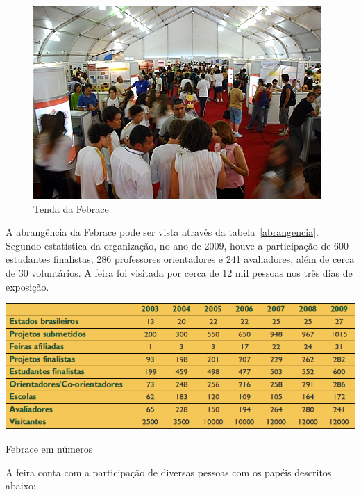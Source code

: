    \begin{figure}
        \begin{center}
    \includegraphics[width=1.0\linewidth]{arquivos/febrace.jpg}
        \end{center}
        \caption{Tenda da Febrace}
        \label{febrace}
    \end{figure}

A abrangência da Febrace pode ser vista através da tabela~\ref{abrangencia}. Segundo estatística da organização, no ano de 2009, houve a participação de 600 estudantes finalistas, 286 professores orientadores e 241 avaliadores, além de cerca de 30 voluntários. A feira foi visitada por cerca de 12 mil pessoas nos três dias de exposição. 

\begin{table}[h]
    \begin{center}
        \includegraphics[width=0.8\linewidth]{arquivos/abrangencia.png}
    \end{center}
    \caption{Febrace em números}
    \label{abrangencia}
\end{table}

A feira conta com a participação de diversas pessoas com os papéis descritos abaixo:


